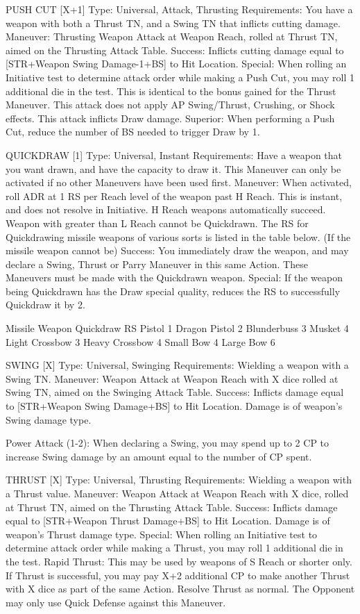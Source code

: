 \documentclass[oneside,11pt,english]{book}
\begin{document}
PUSH CUT [X+1] 
Type: Universal, Attack, Thrusting 
Requirements: You have a weapon with both a Thrust TN, and a Swing TN that inflicts cutting damage. 
Maneuver: Thrusting Weapon Attack at Weapon Reach, rolled at Thrust TN, aimed on the Thrusting 
Attack Table.
Success: Inflicts cutting damage equal to [STR+Weapon Swing Damage-1+BS] to Hit Location. 
Special: When rolling an Initiative test to determine attack order while making a Push Cut, you may roll 1 
additional die in the test. This is identical to the bonus gained for the Thrust Maneuver. 
This attack does not apply AP Swing/Thrust, Crushing, or Shock effects. 
This attack inflicts Draw damage. 
Superior: When performing a Push Cut, reduce the number of BS needed to trigger Draw by 1.

QUICKDRAW [1] 
Type: Universal, Instant 
Requirements: Have a weapon that you want drawn, and have the capacity to draw it. This Maneuver can only be activated if no other Maneuvers have been used first.
Maneuver: When activated, roll ADR at 1 RS per Reach level of the weapon past H Reach. This is instant, and does not resolve in Initiative. H Reach weapons automatically succeed. Weapon with greater than L Reach cannot be Quickdrawn.
The RS for Quickdrawing missile weapons of various sorts is listed in the table below. (If the missile weapon cannot be)
Success: You immediately draw the weapon, and may declare a Swing, Thrust or Parry Maneuver in this same Action. These Maneuvers must be made with the Quickdrawn weapon. 
Special: If the weapon being Quickdrawn has the Draw special quality, reduces the RS to successfully Quickdraw it by 2. 


Missile Weapon Quickdraw RS 
Pistol 1 
Dragon Pistol 2 
Blunderbuss 3 
Musket 4 
Light Crossbow 3 
Heavy Crossbow 4 
Small Bow 4 
Large Bow 6 


SWING [X] 
Type: Universal, Swinging 
Requirements: Wielding a weapon with a Swing TN. 
Maneuver: Weapon Attack at Weapon Reach with X dice rolled at Swing TN, aimed on the Swinging 
Attack Table. 
Success: Inflicts damage equal to [STR+Weapon Swing Damage+BS] to Hit Location. Damage is of 
weapon’s Swing damage type. 


Power Attack (1-2): When declaring a Swing, you may spend up to 2 CP to increase Swing damage by 
an amount equal to the number of CP spent. 

 

THRUST [X] 
Type: Universal, Thrusting 
Requirements: Wielding a weapon with a Thrust value. 
Maneuver: Weapon Attack at Weapon Reach with X dice, rolled at Thrust TN, aimed on the Thrusting 
Attack Table. 
Success: Inflicts damage equal to [STR+Weapon Thrust Damage+BS] to Hit Location. Damage is of 
weapon’s Thrust damage type. 
Special: When rolling an Initiative test to determine attack order while making a Thrust, you may roll 1 
additional die in the test. 
Rapid Thrust: This may be used by weapons of S Reach or shorter only. If Thrust is successful, you may 
pay X+2 additional CP to make another Thrust with X dice as part of the same Action. Resolve Thrust as 
normal. The Opponent may only use Quick Defense against this Maneuver. 
\end{document}
